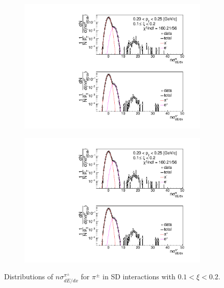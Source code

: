 \begin{figure}[h!]
\begin{subfigure}{.33\textwidth}
	\end{subfigure}
	\begin{subfigure}{.3\textwidth}
		\includegraphics[width=\linewidth, page=9]{chapters/chrgSTAR/img/dEdx/fit2019_secondStep_0_2.pdf}
	\end{subfigure}
	\begin{subfigure}{.3\textwidth}
		\includegraphics[width=\linewidth, page=10]{chapters/chrgSTAR/img/dEdx/fit2019_secondStep_0_2.pdf}
	\end{subfigure}
	\caption[Distributions of $n\sigma^{\pi^\pm}_{dE/dx}$ for $\pi^\pm$ in SD interactions with $0.1 < \xi<0.2$]{Distributions of $n\sigma^{\pi^\pm}_{dE/dx}$ for $\pi^\pm$ in SD interactions with $0.1 < \xi<0.2$.}
	\label{fig:nsigmapifit_2}
\end{figure}
